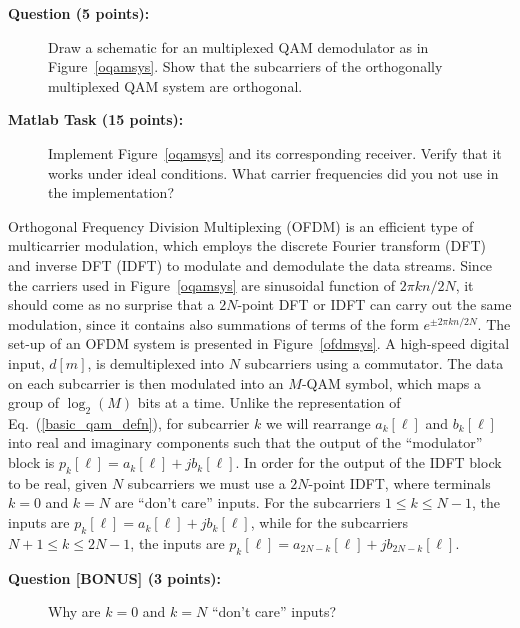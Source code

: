 \documentclass[letterpaper,12pt]{article}
\newcounter{questioncnt}
\newcounter{matlabcnt}
\begin{document}
\begin{description}
    \item[{\bf Question  (5 points):}]
    Draw a schematic for an %
    multiplexed QAM
    demodulator as in Figure~\ref{oqamsys}. Show that the subcarriers of the orthogonally multiplexed
    QAM system are orthogonal.
\end{description}


\begin{description}
    \item[{\bf Matlab Task  (15 points):}]
    Implement Figure~\ref{oqamsys} and its corresponding receiver.
    Verify that it works under ideal conditions. What carrier
    frequencies did you not use in the implementation?
\end{description}


Orthogonal Frequency Division Multiplexing (OFDM) is an efficient
type of multicarrier modulation, which employs the discrete
Fourier transform (DFT) and inverse DFT (IDFT) to modulate and
demodulate the data streams.
Since the carriers used in Figure~\ref{oqamsys} are sinusoidal function of
$2\pi k n/2N$, it should come as no surprise that a $2N$-point DFT or IDFT can
carry out the same modulation, since it contains also summations of terms of
the form $e^{\pm2\pi kn/2N}$.
The set-up of an OFDM system is
presented in Figure~\ref{ofdmsys}. A high-speed digital input,
$d[m]$, is demultiplexed into $N$ subcarriers using a commutator.
The data on each subcarrier is then modulated into an $M$-QAM
symbol, which maps a group of $\log_2(M)$ bits at a time. Unlike
the %
 representation of Eq.~(\ref{basic_qam_defn}), for
subcarrier $k$ we will rearrange $a_k[\ell]$ and $b_k[\ell]$ into real and
imaginary components such that the output of the ``modulator'' block  is
$p_k[\ell]=a_k[\ell]+jb_k[\ell]$. In order for the output of the IDFT block to be
real, given $N$ subcarriers we must use a $2N$-point IDFT, where
terminals $k=0$ and $k=N$ are ``don't care'' inputs. For the
subcarriers $1\le{k}\le{N-1}$, the inputs are $p_k[\ell]=a_k[\ell]+jb_k[\ell]$,
while for the subcarriers $N+1\le{k}\le{2N-1}$, the inputs are
$p_{k}[\ell]=a_{2N-k}[\ell]+jb_{2N-k}[\ell]$.

\begin{description}
    \item[{\bf Question  [BONUS] (3 points):}]
    Why are $k=0$ and $k=N$ ``don't care'' inputs?
\end{description}
\end{document}
